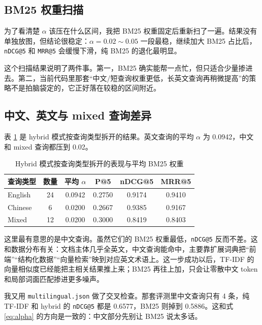 \subsection{BM25 权重扫描}
为了看清楚 $\alpha$ 该压在什么区间，我把 BM25 权重固定后重新扫了一遍。结果没有单独放图，但结论很稳定：$\alpha=0.02\sim0.05$ 一段最稳，继续加大 BM25 占比后，\texttt{nDCG@5} 和 \texttt{MRR@5} 会缓慢下滑，纯 BM25 的退化最明显。

这个扫描结果说明了两件事。第一，BM25 确实能帮一点忙，但只适合少量掺进去。第二，当前代码里那套“中文/短查询权重更低，长英文查询再稍微提高”的策略不是拍脑袋定的，它正好落在较稳的区间附近。

\subsection{中文、英文与 mixed 查询差异}
表 \ref{tab:type-breakdown} 是 hybrid 模式按查询类型拆开的结果。英文查询的平均 $\alpha$ 为 0.0942，中文和 mixed 查询都压到 0.02。

\begin{table}[H]
\centering
\caption{Hybrid 模式按查询类型拆开的表现与平均 BM25 权重}
\label{tab:type-breakdown}
\begin{tabular}{lccccc}
\toprule
查询类型 & 数量 & 平均 $\alpha$ & P@5 & nDCG@5 & MRR@5 \\
\midrule
English & 24 & 0.0942 & 0.2750 & 0.9174 & 0.9410 \\
Chinese & 6 & 0.0200 & 0.2667 & 0.9385 & 0.9167 \\
Mixed & 12 & 0.0200 & 0.3000 & 0.8419 & 0.8403 \\
\bottomrule
\end{tabular}
\end{table}

这里最有意思的是中文查询。虽然它们的 BM25 权重最低，\texttt{nDCG@5} 反而不差。这和数据分布有关：文档主体几乎全英文，中文查询能命中，主要靠扩展词典把“前端”“结构化数据”“向量检索”映到对应英文术语上。这一步成功以后，TF-IDF 的向量相似度已经能把主相关结果推上来；BM25 再往上加，只会让零散中文 token 和局部词面匹配掺进更多噪声。

我又用 \texttt{multilingual.json} 做了交叉检查。那套评测里中文查询只有 4 条，纯 TF-IDF 和 hybrid 的 \texttt{nDCG@5} 都是 0.6577，BM25 则掉到 0.5886。这和式 \eqref{eq:alpha} 的方向是一致的：中文部分先别让 BM25 说太多话。

